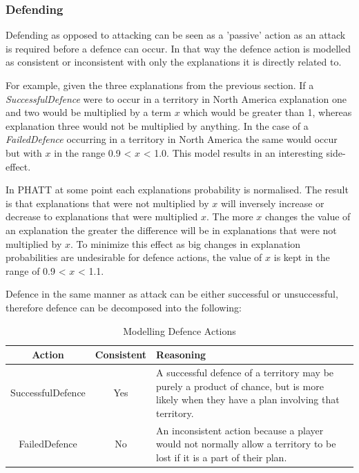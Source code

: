 \documentclass[parskip]{cs4rep}
\begin{document}
\newpage

\subsubsection{Defending}

Defending as opposed to attacking can be seen as a 'passive' action as an attack is required before a defence can occur. In that way the defence action is modelled as consistent or inconsistent with only the explanations it is directly related to. 

For example, given the three explanations from the previous section. If a \textit{SuccessfulDefence} were to occur in a territory in North America explanation one and two would be multiplied by a term $x$ which would be greater than 1, whereas explanation three would not be multiplied by anything. In the case of a \textit{FailedDefence} occurring in a territory in North America the same would occur but with $x$ in the range 0.9 < $x$ < 1.0. This model results in an interesting side-effect.

In PHATT at some point each explanations probability is normalised. The result is that explanations that were not multiplied by $x$ will inversely increase or decrease to explanations that were multiplied $x$. The more $x$ changes the value of an explanation the greater the difference will be in explanations that were not multiplied by $x$. To minimize this effect as big changes in explanation probabilities are undesirable for defence actions, the value of $x$ is kept in the range of 0.9 < $x$ < 1.1.

Defence in the same manner as attack can be either successful or unsuccessful, therefore defence can be decomposed into the following: 

\begin{table}[ht]
\centering
\begin{tabular}{|c|c|p{8cm}|}
\hline 
\textbf{Action} & \textbf{Consistent}  & \textbf{Reasoning} \\ 
\hline 
SuccessfulDefence & Yes & A successful defence of a territory may be purely a product of chance, but is more likely when they have a plan involving that territory. \\ 
\hline 
FailedDefence & No & An inconsistent action because a player would not normally allow a territory to be lost if it is a part of their plan. \\ 
\hline
\end{tabular}
\caption{Modelling Defence Actions}
\label{table:attack-defend-modelling}
\end{table}
\end{document}
